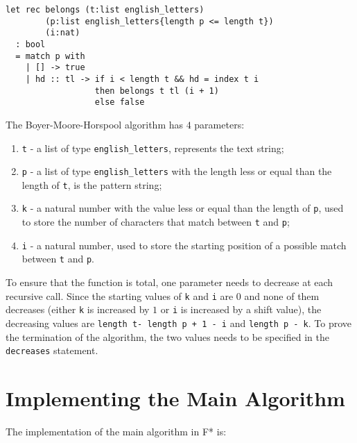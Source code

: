 \begin{verbatim}
let rec belongs (t:list english_letters)
        (p:list english_letters{length p <= length t})
        (i:nat)
  : bool
  = match p with
    | [] -> true
    | hd :: tl -> if i < length t && hd = index t i 
                  then belongs t tl (i + 1)
                  else false
\end{verbatim}

The Boyer-Moore-Horspool algorithm has \(4\) parameters:
\begin{enumerate}
\item \texttt{t} - a list of type \texttt{english\_letters}, represents the text string;
\item \texttt{p} - a list of type \texttt{english\_letters} with the length less or equal than the length of \texttt{t}, is the pattern string;
\item \texttt{k} - a natural number with the value less or equal than the length of \texttt{p}, used to store the number of characters that match between \texttt{t} and \texttt{p};
\item \texttt{i} - a natural number, used to store the starting position of a possible match between \texttt{t} and \texttt{p}.
\end{enumerate}

To ensure that the function is total, one parameter needs to decrease at each recursive call. Since the starting values of \texttt{k} and \texttt{i} are \(0\) and none of them decreases (either \texttt{k} is increased by \(1\) or \texttt{i} is increased by a shift value), the decreasing values are \texttt{length t- length p + 1 - i} and \texttt{length p - k}. To prove the termination of the algorithm, the two values needs to be specified in the \texttt{decreases} statement.

\section{Implementing the Main Algorithm}

The implementation of the main algorithm in F* is:

